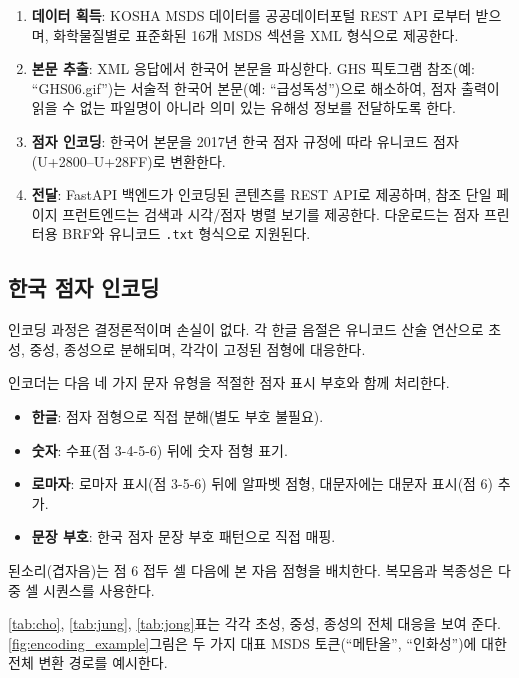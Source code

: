 \documentclass[journal]{IEEEtran}
\begin{document}
\begin{enumerate}
\item \textbf{데이터 획득}: KOSHA MSDS 데이터를 공공데이터포털 REST API \cite{data_go_kr}로부터 받으며, 화학물질별로 표준화된 16개 MSDS 섹션을 XML 형식으로 제공한다.

\item \textbf{본문 추출}: XML 응답에서 한국어 본문을 파싱한다. GHS 픽토그램 참조(예: ``GHS06.gif'')는 서술적 한국어 본문(예: ``{급성독성}'')으로 해소하여, 점자 출력이 읽을 수 없는 파일명이 아니라 의미 있는 유해성 정보를 전달하도록 한다.

\item \textbf{점자 인코딩}: 한국어 본문을 2017년 한국 점자 규정에 따라 유니코드 점자(U+2800--U+28FF)로 변환한다.

\item \textbf{전달}: FastAPI 백엔드가 인코딩된 콘텐츠를 REST API로 제공하며, 참조 단일 페이지 프런트엔드는 검색과 시각/점자 병렬 보기를 제공한다. 다운로드는 점자 프린터용 BRF와 유니코드 \texttt{.txt} 형식으로 지원된다.
\end{enumerate}

\subsection{한국 점자 인코딩}

인코딩 과정은 결정론적이며 손실이 없다. 각 한글 음절은 유니코드 산술 연산으로 초성, 중성, 종성으로 분해되며, 각각이 고정된 점형에 대응한다.

인코더는 다음 네 가지 문자 유형을 적절한 점자 표시 부호와 함께 처리한다.

\begin{itemize}
\item \textbf{한글}: 점자 점형으로 직접 분해(별도 부호 불필요).
\item \textbf{숫자}: 수표(점 3-4-5-6) 뒤에 숫자 점형 표기.
\item \textbf{로마자}: 로마자 표시(점 3-5-6) 뒤에 알파벳 점형, 대문자에는 대문자 표시(점 6) 추가.
\item \textbf{문장 부호}: 한국 점자 문장 부호 패턴으로 직접 매핑.
\end{itemize}

된소리(겹자음)는 점 6 접두 셀 다음에 본 자음 점형을 배치한다. 복모음과 복종성은 다중 셀 시퀀스를 사용한다.

\ref{tab:cho}, \ref{tab:jung}, \ref{tab:jong}표는 각각 초성, 중성, 종성의 전체 대응을 보여 준다. \ref{fig:encoding_example}그림은 두 가지 대표 MSDS 토큰(``메탄올'', ``인화성'')에 대한 전체 변환 경로를 예시한다.
\end{document}
